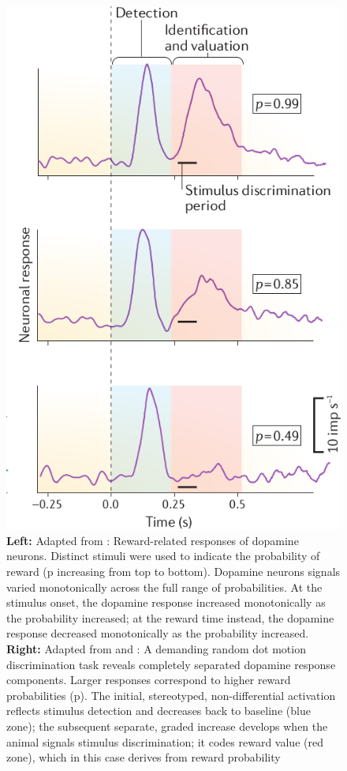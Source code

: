 \begin{figure}[H]
    \includegraphics[scale=0.35]{figures/ResponseProbSchultz.png}
    \caption{\textbf{Left:} Adapted from : Reward-related responses of dopamine neurons. Distinct stimuli were used to indicate the probability of reward (p increasing from top to bottom). Dopamine neurons signals varied monotonically across the full range of probabilities. At the stimulus onset, the dopamine response increased monotonically as the probability increased; at the reward time instead, the dopamine response decreased monotonically as the probability increased. \textbf{Right:} Adapted from  and : A demanding random dot motion discrimination task reveals completely separated dopamine response components. Larger responses correspond to higher reward probabilities (p). The initial, stereotyped, non-differential activation reflects stimulus detection and decreases back to baseline (blue zone); the subsequent separate, graded increase develops when the animal signals stimulus discrimination; it codes reward value (red zone), which in this case derives from reward probability}
    \label{fig:probDopamine}
\end{figure}
